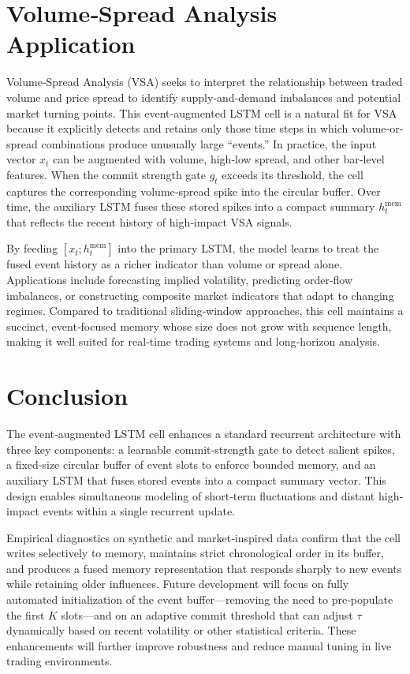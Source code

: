 \documentclass{article}
\begin{document}
	\section{Volume‐Spread Analysis Application}
	
	Volume‐Spread Analysis (VSA) seeks to interpret the relationship between traded volume and price spread to identify supply‐and‐demand imbalances and potential market turning points.  This event‐augmented LSTM cell is a natural fit for VSA because it explicitly detects and retains only those time steps in which volume‐or‐spread combinations produce unusually large “events.”  In practice, the input vector \(x_t\) can be augmented with volume, high‐low spread, and other bar‐level features.  When the commit strength gate \(g_t\) exceeds its threshold, the cell captures the corresponding volume‐spread spike into the circular buffer.  Over time, the auxiliary LSTM fuses these stored spikes into a compact summary \(h_t^{\mathrm{mem}}\) that reflects the recent history of high‐impact VSA signals.
	
	By feeding \([x_t; h_t^{\mathrm{mem}}]\) into the primary LSTM, the model learns to treat the fused event history as a richer indicator than volume or spread alone.  Applications include forecasting implied volatility, predicting order‐flow imbalances, or constructing composite market indicators that adapt to changing regimes.  Compared to traditional sliding‐window approaches, this cell maintains a succinct, event‐focused memory whose size does not grow with sequence length, making it well suited for real‐time trading systems and long‐horizon analysis.
	
	\section{Conclusion}
	
	The event‐augmented LSTM cell enhances a standard recurrent architecture with three key components: a learnable commit‐strength gate to detect salient spikes, a fixed‐size circular buffer of event slots to enforce bounded memory, and an auxiliary LSTM that fuses stored events into a compact summary vector.  This design enables simultaneous modeling of short‐term fluctuations and distant high‐impact events within a single recurrent update.
	
	Empirical diagnostics on synthetic and market‐inspired data confirm that the cell writes selectively to memory, maintains strict chronological order in its buffer, and produces a fused memory representation that responds sharply to new events while retaining older influences.  Future development will focus on fully automated initialization of the event buffer—removing the need to pre‐populate the first \(K\) slots—and on an adaptive commit threshold that can adjust \(\tau\) dynamically based on recent volatility or other statistical criteria.  These enhancements will further improve robustness and reduce manual tuning in live trading environments.
	
	
\end{document}
